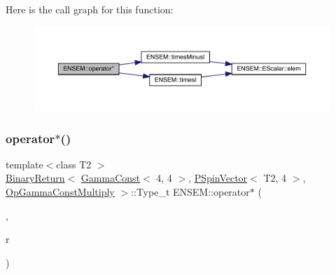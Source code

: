 Here is the call graph for this function\+:\nopagebreak
\begin{figure}[H]
\begin{center}
\leavevmode
\includegraphics[width=350pt]{dd/d6d/group__primspinvector_gade157607bce53ec9ffcde3e07f772efb_cgraph}
\end{center}
\end{figure}
\mbox{\label{group__primspinvector_gaa8429bcfc1a7a130ec526f34f8b08c20}} 
\subsubsection{\texorpdfstring{operator$\ast$()}{operator*()}\hspace{0.1cm}{\footnotesize\ttfamily [5/32]}}
{\footnotesize\ttfamily template$<$class T2 $>$ \\
\mbox{\hyperlink{structENSEM_1_1BinaryReturn}{Binary\+Return}}$<$ \mbox{\hyperlink{classENSEM_1_1GammaConst}{Gamma\+Const}}$<$ 4, 4 $>$, \mbox{\hyperlink{classENSEM_1_1PSpinVector}{P\+Spin\+Vector}}$<$ T2, 4 $>$, \mbox{\hyperlink{structENSEM_1_1OpGammaConstMultiply}{Op\+Gamma\+Const\+Multiply}} $>$\+::Type\+\_\+t E\+N\+S\+E\+M\+::operator$\ast$ (\begin{DoxyParamCaption}\item[{const \mbox{\hyperlink{classENSEM_1_1GammaConst}{Gamma\+Const}}$<$ 4, 4 $>$ \&}]{,  }\item[{const \mbox{\hyperlink{classENSEM_1_1PSpinVector}{P\+Spin\+Vector}}$<$ T2, 4 $>$ \&}]{r }\end{DoxyParamCaption})\hspace{0.3cm}{\ttfamily [inline]}}

